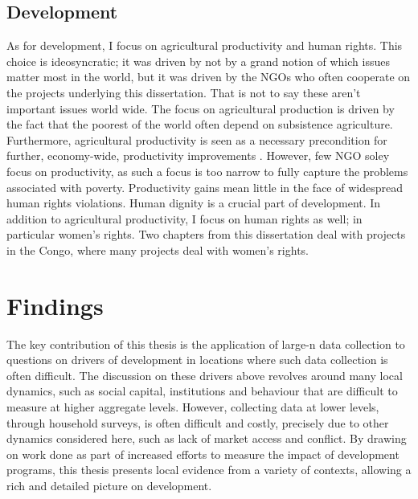 
\subsection{Development}
As for development, I focus on agricultural productivity and human rights. This choice is ideosyncratic; it was driven by not by a grand notion of which issues matter most in the world, but it was driven by the NGOs who often cooperate on the projects underlying this dissertation. That is not to say these aren't important issues world wide. The focus on agricultural production is driven by the fact that the poorest of the world often depend on subsistence agriculture. Furthermore, agricultural productivity is seen as a necessary precondition for further, economy-wide, productivity improvements \citep{WorldBank2008}. However, few NGO soley focus on productivity, as such a focus is too narrow to fully capture the problems associated with poverty. Productivity gains mean little in the face of widespread human rights violations. Human dignity is a crucial part of development. In addition to agricultural productivity, I focus on human rights as well; in particular women's rights. Two chapters from this dissertation deal with projects in the Congo, where many projects deal with women's rights. 

\section{Findings}
The key contribution of this thesis is the application of large-n data collection to questions on drivers of development in locations where such data collection is often difficult. The discussion on these drivers above revolves around many local dynamics, such as social capital, institutions and behaviour that are difficult to measure at higher aggregate levels. However, collecting data at lower levels, through household surveys, is often difficult and costly, precisely due to other dynamics considered here, such as lack of market access and conflict. By drawing on work done as part of increased efforts to measure the impact of development programs, this thesis presents local evidence from a variety of contexts, allowing a rich and detailed picture on development.

